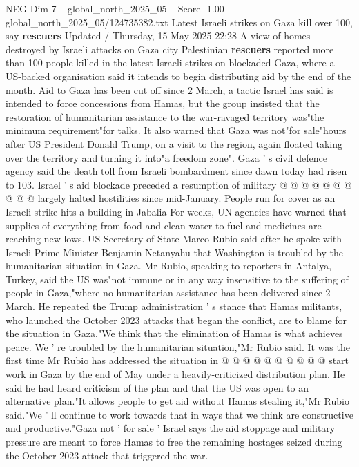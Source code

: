 \begin{textsample}{NEG Dim 7 – global\_north\_2025\_05 – Score -1.00 – global\_north\_2025\_05/124735382.txt}  \label{ex:f7_neg_123}
Latest Israeli strikes on Gaza kill over 100, say \textbf{rescuers} Updated / Thursday, 15 May 2025 22:28 A view of homes destroyed by Israeli attacks on Gaza city Palestinian \textbf{rescuers} reported more than 100 people killed in the latest Israeli strikes on blockaded Gaza, where a US-backed organisation said it intends to begin distributing aid by the end of the month.
Aid to Gaza has been cut off since 2 March, a tactic Israel has said is intended to force concessions from Hamas, but the group insisted that the restoration of humanitarian assistance to the war-ravaged territory was"the minimum requirement"for talks.
It also warned that Gaza was not"for sale"hours after US President Donald Trump, on a visit to the region, again floated taking over the territory and turning it into"a freedom zone".
Gaza ' s civil defence agency said the death toll from Israeli bombardment since dawn today had risen to 103.
Israel ' s aid blockade preceded a resumption of military @ @ @ @ @ @ @ @ @ @ largely halted hostilities since mid-January.
People run for cover as an Israeli strike hits a building in Jabalia For weeks, UN agencies have warned that supplies of everything from food and clean water to fuel and medicines are reaching new lows.
US Secretary of State Marco Rubio said after he spoke with Israeli Prime Minister Benjamin Netanyahu that Washington is troubled by the humanitarian situation in Gaza.
Mr Rubio, speaking to reporters in Antalya, Turkey, said the US was"not immune or in any way insensitive to the suffering of people in Gaza,"where no humanitarian assistance has been delivered since 2 March.
He repeated the Trump administration ' s stance that Hamas militants, who launched the October 2023 attacks that began the conflict, are to blame for the situation in Gaza."We think that the elimination of Hamas is what achieves peace.
We ' re troubled by the humanitarian situation,"Mr Rubio said.
It was the first time Mr Rubio has addressed the situation in @ @ @ @ @ @ @ @ @ @ start work in Gaza by the end of May under a heavily-criticized distribution plan.
He said he had heard criticism of the plan and that the US was open to an alternative plan."It allows people to get aid without Hamas stealing it,"Mr Rubio said."We ' ll continue to work towards that in ways that we think are constructive and productive."Gaza not ' for sale ' Israel says the aid stoppage and military pressure are meant to force Hamas to free the remaining hostages seized during the October 2023 attack that triggered the war.

\end{textsample}
